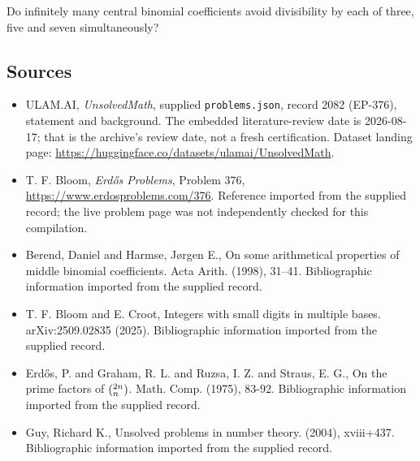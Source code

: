 \documentclass[11pt,a4paper]{article}
\begin{document}
Do infinitely many central binomial coefficients avoid divisibility by each of three, five and seven simultaneously?

\subsection{Sources}

{\small

\begin{itemize}

\item[\hypertarget{source:2082:1}{S1}] ULAM.AI, \emph{UnsolvedMath}, supplied \texttt{problems.json}, record 2082 (EP-376), statement and background. The embedded literature-review date is 2026-08-17; that is the archive’s review date, not a fresh certification. Dataset landing page: \url{https://huggingface.co/datasets/ulamai/UnsolvedMath}.

\item[\hypertarget{source:2082:2}{S2}] T. F. Bloom, \emph{Erdős Problems}, Problem 376, \url{https://www.erdosproblems.com/376}. Reference imported from the supplied record; the live problem page was not independently checked for this compilation.

\item[\hypertarget{source:2082:3}{S3}] Berend, Daniel and Harmse, J\o rgen E., On some arithmetical properties of middle binomial coefficients. Acta Arith. (1998), 31--41. Bibliographic information imported from the supplied record.

\item[\hypertarget{source:2082:4}{S4}] T. F. Bloom and E. Croot, Integers with small digits in multiple bases. arXiv:2509.02835 (2025). Bibliographic information imported from the supplied record.

\item[\hypertarget{source:2082:5}{S5}] Erd\H{o}s, P. and Graham, R. L. and Ruzsa, I. Z. and Straus, E. G., On the prime factors of $(\sp{2n}\sb{n})$. Math. Comp. (1975), 83-92. Bibliographic information imported from the supplied record.

\item[\hypertarget{source:2082:6}{S6}] Guy, Richard K., Unsolved problems in number theory. (2004), xviii+437. Bibliographic information imported from the supplied record.

\end{itemize}

}

\label{end:2082}
\end{document}
